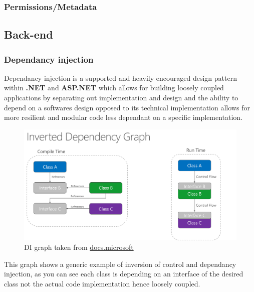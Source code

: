 \documentclass[12pt]{article}
\begin{document}
\subsubsection{Permissions/Metadata}


\subsection{Back-end}


\subsubsection{Dependancy injection}

Dependancy injection is a supported and heavily encouraged design pattern within \textbf{.NET} and \textbf{ASP.NET} which allows for building loosely coupled applications by separating out implementation and design and the ability to depend on a softwares design opposed to its technical implementation allows for more resilient and modular code less dependant on a specific implementation.

\begin{figure}[H]
\caption{DI graph taken from \href{https://docs.microsoft.com/en-us/dotnet/architecture/modern-web-apps-azure/architectural-principles#dependency-inversion}{docs.microsoft}}
\centering
\includegraphics[width=\textwidth,height=\textheight,keepaspectratio]{images/patterns/ms-di}
\centering
\end{figure}

This graph shows a generic example of inversion of control and dependancy injection, as you can see each class is depending on an interface of the desired class not the actual code implementation hence loosely coupled.
\end{document}
